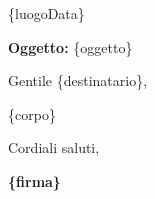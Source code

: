 \documentclass[12pt,a4paper]{article}
\begin{document}
\begin{flushright}
\{luogoData\}
\end{flushright}

\textbf{Oggetto:} \{oggetto\}

\vspace{1cm}
Gentile \{destinatario\},

\vspace{0.5cm}
\{corpo\}

\vspace{1.5cm}
Cordiali saluti,

\vspace{1cm}
\textbf{\{firma\}}
\end{document}
